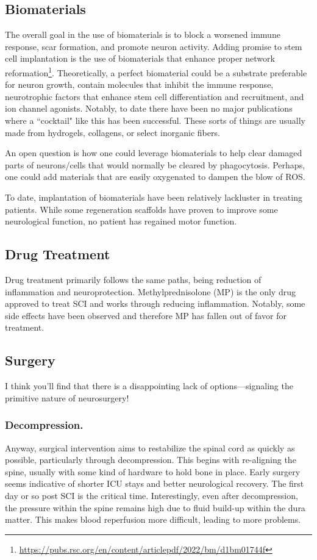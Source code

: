 \subsection{Biomaterials}
The overall goal in the use of biomaterials is to block a worsened immune response, scar formation, and promote neuron activity. Adding promise to stem cell implantation is the use of biomaterials that enhance proper network reformation\footnote{\url{https://pubs.rsc.org/en/content/articlepdf/2022/bm/d1bm01744f}}. Theoretically, a perfect biomaterial could be a substrate preferable for neuron growth, contain molecules that inhibit the immune response, neurotrophic factors that enhance stem cell differentiation and recruitment, and ion channel agonists. Notably, to date there have been no major publications where a ``cocktail" like this has been successful. These sorts of things are usually made from hydrogels, collagens, or select inorganic fibers.\newline

An open question is how one could leverage biomaterials to help clear damaged parts of neurons/cells that would normally be cleared by phagocytosis. Perhaps, one could add materials that are easily oxygenated to dampen the blow of ROS.\newline

To date, implantation of biomaterials have been relatively lackluster in treating patients. While some regeneration scaffolds have proven to improve some neurological function, no patient has regained motor function. 

\subsection{Drug Treatment}
Drug treatment primarily follows the same paths, being reduction of inflammation and neuroprotection. Methylprednisolone (MP) is the only drug approved to treat SCI and works through reducing inflammation. Notably, some side effects have been observed and therefore MP has fallen out of favor for treatment. 

\subsection{Surgery}
I think you'll find that there is a disappointing lack of options---signaling the primitive nature of neurosurgery!

\subsubsection{Decompression.}
 Anyway, surgical intervention aims to restabilize the spinal cord as quickly as possible, particularly through decompression. This begins with re-aligning the spine, usually with some kind of hardware to hold bone in place. Early surgery seems indicative of shorter ICU stays and better neurological recovery. The first day or so post SCI is the critical time. Interestingly, even after decompression, the pressure within the spine remains high due to fluid build-up within the dura matter. This makes blood reperfusion more difficult, leading to more problems. 
 
